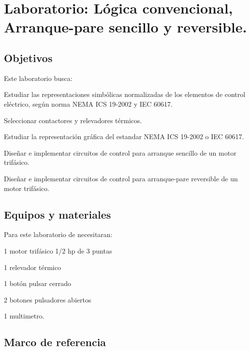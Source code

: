 
\chapter{Laboratorio: Lógica convencional, Arranque-pare sencillo y reversible.}


\section{Objetivos}
Este  laboratorio busca:
\begin{itemize}
	{\small
	 \item  Estudiar  las representaciones simbólicas normalizadas de los elementos de control eléctrico, según norma NEMA ICS 19-2002 y IEC 60617.
	 \item Seleccionar contactores y relevadores térmicos.
	 \item  Estudiar la representación gráfica del estandar NEMA ICS 19-2002 o IEC 60617. 
	 \item  Diseñar e implementar circuitos de control para arranque sencillo de un motor trifásico.
	 \item  Diseñar e implementar circuitos de control para arranque-pare reversible de un  motor trifásico.
 }
\end{itemize} 

 
\section{Equipos y materiales}
Para este laboratorio de necesitaran:
\begin{itemize}
	{\small \item 1 motor trifásico 1/2 hp de 3 puntas
	\item 1 relevador térmico
	\item 1 botón pulsar cerrado
	\item 2 botones pulsadores abiertos
	\item 1 multimetro.
}
\end{itemize}

\section{Marco de referencia}

